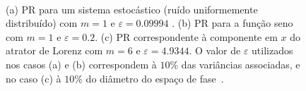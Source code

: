 \begin{figure}[ht]
\centering 
{}  \\   
\caption{(a) PR para um sistema estocástico (ruído uniformemente distribuído) com $m=1$ e $\varepsilon=0.09994$ . (b) PR para a função seno com $m=1$ e $\varepsilon=0.2$. (c) PR correspondente à componente em $x$ do atrator de Lorenz com $m=6$ e $\varepsilon=4.9344$. O valor de $\varepsilon$ utilizados nos casos (a) e (b) correspondem à $10\%$ das variâncias associadas, e no caso (c) à $10\%$ do diâmetro do espaço de fase~\cite{thielromano/04}.}
\label{figrpsistemas}
\end{figure}


